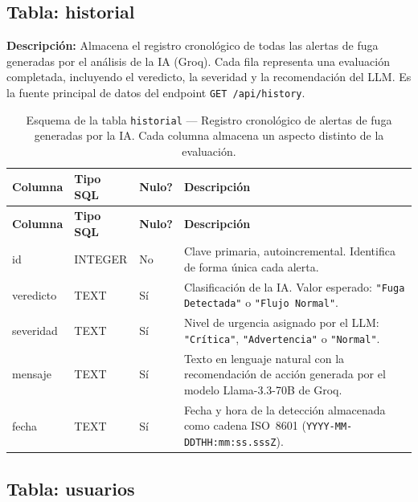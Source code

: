 \documentclass[12pt,a4paper]{article}
\begin{document}
\subsection{Tabla: historial}

\begin{mdframed}[linecolor=normalgreen,linewidth=1pt,backgroundcolor=green!3]
\textbf{Descripción:} Almacena el registro cronológico de todas las alertas de fuga
generadas por el análisis de la IA (Groq). Cada fila representa una evaluación
completada, incluyendo el veredicto, la severidad y la recomendación del LLM. Es la
fuente principal de datos del endpoint \texttt{GET /api/history}.
\end{mdframed}

\vspace{0.5em}

\begin{longtable}{>{\ttfamily}p{3.5cm} p{2cm} p{2cm} p{5.5cm}}
\caption{Esquema de la tabla \texttt{historial} --- Registro cronológico de alertas de
  fuga generadas por la IA. Cada columna almacena un aspecto distinto de la evaluación.}
\label{tab:tabla-historial} \\
\toprule
\textbf{Columna} & \textbf{Tipo SQL} & \textbf{Nulo?} & \textbf{Descripción} \\
\midrule
\endfirsthead
\toprule
\textbf{Columna} & \textbf{Tipo SQL} & \textbf{Nulo?} & \textbf{Descripción} \\
\midrule
\endhead
\bottomrule
\endlastfoot
id & INTEGER & No &
  Clave primaria, autoincremental. Identifica de forma única cada alerta. \\[0.5em]
veredicto & TEXT & Sí &
  Clasificación de la IA. Valor esperado: \texttt{"Fuga Detectada"} o
  \texttt{"Flujo Normal"}. \\[0.5em]
severidad & TEXT & Sí &
  Nivel de urgencia asignado por el LLM: \texttt{"Crítica"}, \texttt{"Advertencia"}
  o \texttt{"Normal"}. \\[0.5em]
mensaje & TEXT & Sí &
  Texto en lenguaje natural con la recomendación de acción generada por el modelo
  Llama-3.3-70B de Groq. \\[0.5em]
fecha & TEXT & Sí &
  Fecha y hora de la detección almacenada como cadena ISO~8601
  (\texttt{YYYY-MM-DDTHH:mm:ss.sssZ}). \\
\end{longtable}

\subsection{Tabla: usuarios}
\end{document}
